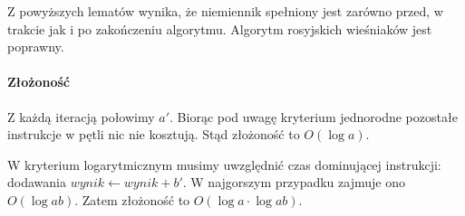 
Z powyższych lematów wynika, że niemiennik spełniony jest zarówno przed, w trakcie jak i po zakończeniu algorytmu. 
Algorytm rosyjskich wieśniaków jest poprawny.

\paragraph{Złożoność}

Z każdą iteracją połowimy $a'$. 
Biorąc pod uwagę kryterium jednorodne pozostałe instrukcje w pętli nic nie kosztują. 
Stąd złożoność to $O(\log a)$.

W kryterium logarytmicznym musimy uwzględnić czas dominującej instrukcji: dodawania  $wynik \leftarrow wynik + b'$. 
W najgorszym przypadku zajmuje ono $O(\log ab)$. Zatem złożoność to $O(\log a \cdot \log ab)$.
